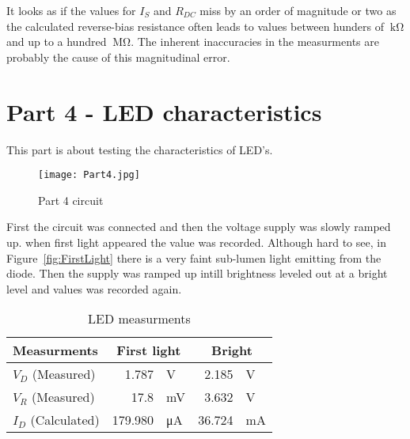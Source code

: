 \documentclass{article}
\begin{document}
It looks as if the values for \(I_S\) and \(R_{DC}\) miss by an order of magnitude or two as the calculated reverse-bias resistance often leads to values between hunders of \(\SI{}{\kilo\ohm}\) and up to a hundred \(\SI{}{\mega\ohm}\). The inherent inaccuracies in the measurments are probably the cause of this magnitudinal error.


\section{Part 4 - LED characteristics}
This part is about testing the characteristics of LED's. 


\begin{figure}[h]
    \centering
    \texttt{[image: Part4.jpg]}
    \caption{Part 4 circuit}
    \label{fig:Part4}
\end{figure}

First the circuit was connected and then the voltage supply was slowly ramped up. when first light appeared the value was recorded. Although hard to see, in Figure~\ref{fig:FirstLight} there is a very faint sub-lumen light emitting from the diode. Then the supply was ramped up intill brightness leveled out at a bright level and values was recorded again.

\clearpage


\begin{table}[htbp]
  \centering
  \caption{LED measurments}
    \begin{tabular}{|l|rl|rl|}
    \hline
    Measurments & \multicolumn{2}{c|}{First light} & \multicolumn{2}{c|}{Bright} \bigstrut\\
    \hline
    \(V_D\) (Measured)   & 1.787   & V   & 2.185  & V \bigstrut\\
    \hline
    \(V_R\) (Measured)   & 17.8    & mV  & 3.632  & V \bigstrut\\
    \hline
    \(I_D\) (Calculated) & 179.980 & μA  & 36.724 & mA \bigstrut\\
    \hline
    \end{tabular}%
  \label{tab:part4}%
\end{table}%
\end{document}
